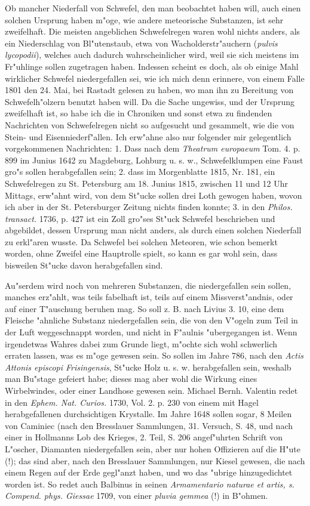\documentclass[a4paper, 11pt, oneside, polutonikogreek, german]{article}
\begin{document}
Ob mancher Niederfall von Schwefel, den man beobachtet haben will, auch einen solchen Ursprung haben m"oge, wie andere meteorische Substanzen, ist sehr zweifelhaft. Die meisten angeblichen Schwefelregen waren wohl nichts anders, als ein Niederschlag von Bl"utenstaub, etwa von Wacholderstr"auchern (\emph{pulvis lycopodii}), welches auch dadurch wahrscheinlicher wird, weil sie sich meistens im Fr"uhlinge sollen zugetragen haben. Indessen scheint es doch, als ob einige Mahl wirklicher Schwefel niedergefallen sei, wie ich mich denn erinnere, von einem Falle 1801 den 24. Mai, bei Rastadt gelesen zu haben, wo man ihn zu Bereitung von Schwefelh"olzern benutzt haben will. Da die Sache ungewiss, und der Ursprung zweifelhaft ist, so habe ich die in Chroniken und sonst etwa zu findenden Nachrichten von Schwefelregen nicht so aufgesucht und gesammelt, wie die von Stein- und Eisenniederf"allen. Ich erw"ahne also nur folgender mir gelegentlich vorgekommenen Nachrichten: 1. Dass nach dem \emph{Theatrum europaeum} Tom. 4. p. 899 im Junius 1642 zu Magdeburg, Lohburg u. s. w., Schwefelklumpen eine Faust gro"s sollen herabgefallen sein; 2. dass im Morgenblatte 1815, Nr. 181, ein Schwefelregen zu St. Petersburg am 18. Junius 1815, zwischen 11 und 12 Uhr Mittags, erw"ahnt wird, von dem St"ucke sollen drei Loth gewogen haben, wovon ich aber in der St. Petersburger Zeitung nichts finden konnte; 3. in den \emph{Philos. transact.} 1736, p. 427 ist ein Zoll gro"ses St"uck Schwefel beschrieben und abgebildet, dessen Ursprung man nicht anders, als durch einen solchen Niederfall zu erkl"aren wusste. Da Schwefel bei solchen Meteoren, wie schon bemerkt worden, ohne Zweifel eine Hauptrolle spielt, so kann es gar wohl sein, dass bisweilen St"ucke davon herabgefallen sind.

Au"serdem wird noch von mehreren Substanzen, die niedergefallen sein sollen, manches erz"ahlt, was teils fabelhaft ist, teils auf einem Missverst"andnis, oder auf einer T"auschung beruhen mag. So soll z. B. nach Livius 3. 10, eine dem Fleische "ahnliche Substanz niedergefallen sein, die von den V"ogeln zum Teil in der Luft weggeschnappt worden, und nicht in F"aulnis "ubergegangen ist. Wenn irgendetwas Wahres dabei zum Grunde liegt, m"ochte sich wohl schwerlich erraten lassen, was es m"oge gewesen sein. So sollen im Jahre 786, nach den \emph{Actis Attonis episcopi Frisingensis}, St"ucke Holz u. s. w. herabgefallen sein, weshalb man Bu"stage gefeiert habe; dieses mag aber wohl die Wirkung eines Wirbelwindes, oder einer Landhose gewesen sein. Michael Bernh. Valentin redet in den \emph{Ephem. Nat. Curios.} 1730, Vol. 2. p. 230 von einem mit Hagel herabgefallenen durchsichtigen Krystalle. Im Jahre 1648 sollen sogar, 8 Meilen von Caminiec (nach den Bresslauer Sammlungen, 31. Versuch, S. 48, und nach einer in Hollmanns Lob des Krieges, 2. Teil, S. 206 angef"uhrten Schrift von L"oscher, Diamanten niedergefallen sein, aber nur hohen Offizieren auf die H"ute (!); das sind aber, nach den Bresslauer Sammlungen, nur Kiesel gewesen, die nach einem Regen auf der Erde gegl"anzt haben, und wo das "ubrige hinzugedichtet worden ist. So redet auch Balbinus in seinen \emph{Armamentario naturae et artis, s. Compend. phys. Giessae} 1709, von einer \emph{pluvia gemmea} (!) in B"ohmen.
\end{document}
